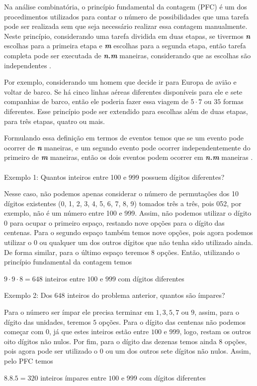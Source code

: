 Na análise combinatória, o princípio fundamental da contagem (PFC) é um dos procedimentos utilizados para contar o número de possibilidades que uma tarefa pode ser realizada sem que seja necessário realizar essa contagem manualmente.
Neste princípio, considerando uma tarefa dividida em duas etapas, se tivermos \textbf{\textit{n}} escolhas para a primeira etapa e \textbf{\textit{m}} escolhas para a segunda etapa, então tarefa completa pode ser executada de \textbf{\textit{n.m}} maneiras, considerando que as escolhas são independentes \cite{dantas2013probabilidade}.

Por exemplo, considerando um homem que decide ir para Europa de avião e voltar de barco. Se há cinco linhas aéreas diferentes disponíveis para ele e sete companhias de barco, então ele poderia fazer essa viagem de $5 \cdot 7$ ou $35$ formas diferentes.
Esse princípio pode ser extendido para escolhas além de duas etapas, para três etapas, quatro ou mais.

Formulando essa definição em termos de eventos temos que se um evento pode ocorrer de \textbf{\textit{n}} maneiras, e um segundo evento pode ocorrer independentemente do primeiro de \textbf{\textit{m}} maneiras, então os dois eventos podem ocorrer em \textbf{\textit{n.m}} maneiras \cite{niven1965mathematics}.\\\\
\noindent
Exemplo 1: Quantos inteiros entre 100 e 999 possuem dígitos diferentes?

Nesse caso, não podemos apenas considerar o número de permutações dos 10 dígitos existentes (0, 1, 2, 3, 4, 5, 6, 7, 8, 9) tomados três a três, pois 052, por exemplo, não é um número entre 100 e 999. Assim, não podemos utilizar o dígito 0 para ocupar o primeiro espaço, restando nove opções para o dígito das centenas. Para o segundo espaço também temos nove opções, pois agora podemos utilizar o 0 ou qualquer um dos outros dígitos que não tenha sido utilizado ainda. De forma similar, para o último espaço teremos 8 opções.
Então, utilizando o princípio fundamental da contagem temos 

\begin{center}
	$9 \cdot 9 \cdot 8 = 648 $ inteiros entre $100$ e $999$ com dígitos diferentes
\end{center}

\noindent
Exemplo 2: Dos $648$ inteiros do problema anterior, quantos são ímpares?

Para o número ser ímpar ele precisa terminar em $1, 3, 5, 7$ ou $9$, assim, para o dígito das unidades, teremos $5$ opções.
Para o dígito das centenas não podemos começar com $0$, já que estes inteiros estão entre $100$ e $999$, logo, restam os outros oito dígitos não nulos.
Por fim, para o dígito das dezenas temos ainda $8$ opções, pois agora pode ser utilizado o $0$ ou um dos  outros sete dígitos não nulos. Assim, pelo PFC temos
\begin{center}
	$8.8.5 = 320$ inteiros ímpares entre $100$ e $999$ com dígitos diferentes
\end{center}


